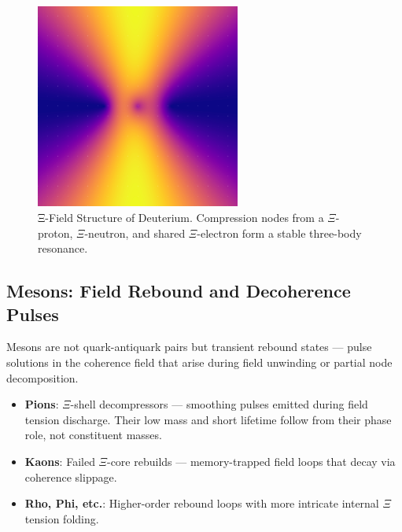\begin{figure}[ht]
\centering
\includegraphics[width=0.6\textwidth]{figures/deuterium_modulus_vector_overlay.png}
\caption{Ξ-Field Structure of Deuterium. Compression nodes from a $\Xi$-proton, $\Xi$-neutron, and shared $\Xi$-electron form a stable three-body resonance.}
\label{fig:deuterium_field}
\end{figure}

\subsection{Mesons: Field Rebound and Decoherence Pulses}

Mesons are not quark-antiquark pairs but transient rebound states — pulse solutions in the coherence field that arise during field unwinding or partial node decomposition.

\begin{itemize}
  \item \textbf{Pions}: $\Xi$-shell decompressors — smoothing pulses emitted during field tension discharge. Their low mass and short lifetime follow from their phase role, not constituent masses.
  \item \textbf{Kaons}: Failed $\Xi$-core rebuilds — memory-trapped field loops that decay via coherence slippage.
  \item \textbf{Rho, Phi, etc.}: Higher-order rebound loops with more intricate internal $\Xi$ tension folding.
\end{itemize}

